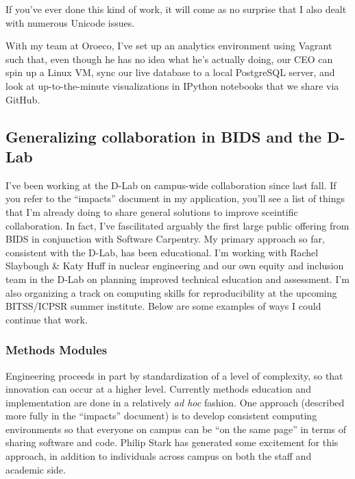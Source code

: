 If you've ever done this kind of work, it will come as no surprise that I also
dealt with numerous Unicode issues.

With my team at Oroeco, I've set up an analytics environment using Vagrant such
that, even though he has no idea what he's actually doing, our CEO can spin up a
Linux VM, sync our live database to a local PostgreSQL server, and look at
up-to-the-minute visualizations in IPython notebooks that we share via GitHub.


\subsection*{Generalizing collaboration in BIDS and the D-Lab}

I've been working at the D-Lab on campus-wide collaboration since last fall. If
you refer to the “impacts” document in my application, you'll see a list of
things that I'm already doing to share general solutions to improve sceintific
collaboration. In fact, I've fascilitated arguably the first large public
offering from BIDS in conjunction with Software Carpentry. My primary approach
so far, consistent with the D-Lab, has been educational. I'm working with Rachel
Slaybough \& Katy Huff in nuclear engineering and our own equity and inclusion
team in the D-Lab on planning improved technical education and assessment. I'm
also organizing a track on computing skills for reproducibility at the upcoming
BITSS/ICPSR summer institute. Below are some examples of ways I could continue
that work.

\subsubsection*{Methods Modules}

Engineering proceeds in part by standardization of a level of complexity, so
that innovation can occur at a higher level. Currently methods education and
implementation are done in a relatively \emph{ad hoc} fashion. One approach
(described more fully in the “impacts” document) is to develop consistent
computing environments so that everyone on campus can be “on the same page” in
terms of sharing software and code. Philip Stark has generated some excitement
for this approach, in addition to individuals across campus on both the staff
and academic side.

